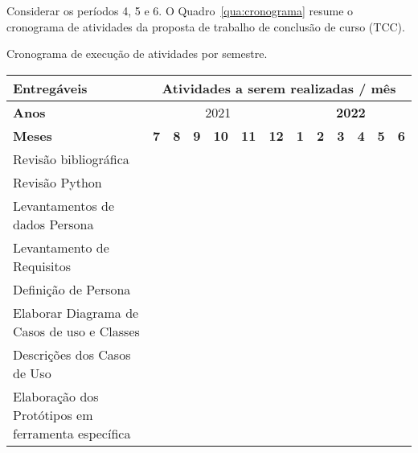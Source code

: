 \justify
Considerar os períodos 4, 5 e 6.
O Quadro~\ref{qua:cronograma} resume o cronograma de atividades da proposta de trabalho de conclusão de curso (TCC).

\begin{quadro}[H]
	\begin{center}
	\caption{Cronograma de execução de atividades por semestre.}
		\label{qua:cronograma}
		\begin{tabular}{|m{6.5cm}|m{.2cm}|m{.2cm}|m{.2cm}|m{.2cm}|m{.2cm}|m{.2cm}|m{.2cm}|m{.2cm}|m{.2cm}|m{.2cm}|m{.2cm}|m{.2cm}|}
			\hline
			\centering
			\cellcolor{gray!50}  \textbf{Entregáveis} & \multicolumn{12}{c|}{ \cellcolor{gray!50}   \textbf{Atividades a serem realizadas / mês}}\\
			\hline
		    \centering
			\textbf{Anos} & \multicolumn{6}{c|}{2021} & \multicolumn{6}{c|}{\textbf{2022}} \\
			\hline
			\centering
			\cellcolor{gray!50} \textbf{Meses} & \cellcolor{gray!50} \textbf{7} & \cellcolor{gray!50} \textbf{8} & \cellcolor{gray!50} \textbf{9} & \cellcolor{gray!50} \textbf{10} & \cellcolor{gray!50} \textbf{11} &
			\cellcolor{gray!50} \textbf{12} & \cellcolor{gray!50} \textbf{1} & \cellcolor{gray!50} \textbf{2} & \cellcolor{gray!50} \textbf{3} & \cellcolor{gray!50} \textbf{4} & \cellcolor{gray!50} \textbf{5} & \cellcolor{gray!50} \textbf{6} \\
			\hline
			Revisão bibliográfica & \cellcolor{gray!50} & \cellcolor{gray!50} & & & & & & & & & &\\
			\hline
			Revisão Python & \cellcolor{gray!50} & \cellcolor{gray!50} & & & & & & & & & &\\
			\hline
			Levantamentos de dados Persona & \cellcolor{gray!50} & \cellcolor{gray!50} & & & & & & & & & &\\
			\hline
			Levantamento de Requisitos &  & \cellcolor{gray!50} & \cellcolor{gray!50} & & & & & & & & &\\
			\hline
			Definição de Persona & & \cellcolor{gray!50} & \cellcolor{gray!50} & & & & & & & & &\\
			\hline
			Elaborar Diagrama de Casos de uso e Classes  & &  &  & \cellcolor{gray!50} & & & & & & & &\\
			\hline
			Descrições dos Casos de Uso  & & &  &\cellcolor{gray!50} & & & & & & & &\\
			\hline
			Elaboração dos Protótipos em ferramenta específica  &  &  &  & \cellcolor{gray!50}    & \cellcolor{gray!50} & & & & & & &\\
			\hline

\end{tabular}
\end{center}
\end{quadro}
